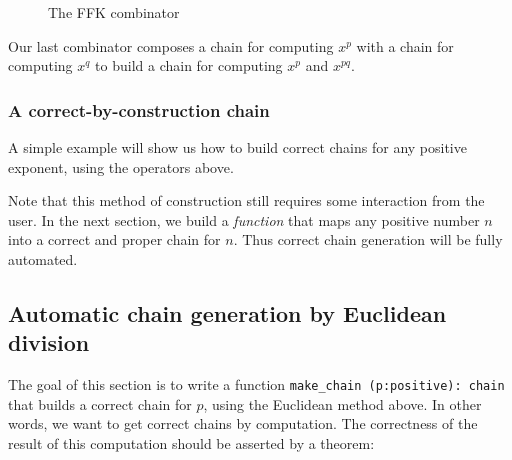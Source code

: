 \begin{figure}[h]
  \centering
  \caption{The FFK combinator}
  \label{fig:FFK}
\end{figure}

Our last combinator composes a chain for computing $x^p$ with a chain for computing $x^q$ to build a chain for
computing $x^p$ and $x^{pq}$.


\subsubsection{A correct-by-construction chain}

A simple example will show us how to build correct chains 
for any positive exponent, using the operators above.


Note that this method of construction still requires some  
interaction from the user. 
In the next section, we build a \emph{function} that maps any 
positive number $n$ into a correct and proper chain for $n$.
Thus correct chain generation will be fully automated.

\subsection{Automatic chain generation by Euclidean division}

The goal of this section is to write a function 
\texttt{make\_chain (p:positive): chain} that builds a correct chain for $p$, using
the Euclidean method above. In other words, we want to get correct chains
by computation. The correctness of the result of this computation should be
asserted by a  theorem:

